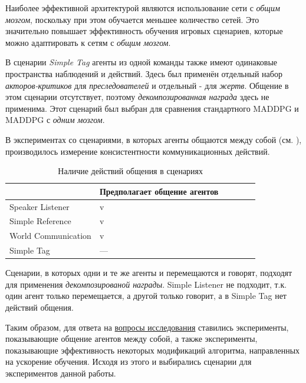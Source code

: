 Наиболее эффективной архитектурой являются использование сети с \textit{общим мозгом}, поскольку при этом обучается меньшее количество сетей. Это значительно повышает эффективность обучения игровых сценариев, которые можно адаптировать к сетям с \textit{общим мозгом}.

В сценарии \textit{Simple Tag} агенты из одной команды также имеют одинаковые пространства наблюдений и действий. Здесь был применён отдельный набор \textit{акторов-критиков} для \textit{преследователей} и отдельный - для \textit{жертв}. Общение в этом сценарии отсутствует, поэтому \textit{декомпозированная награда} здесь не применима. Этот сценарий был выбран для сравнения стандартного MADDPG и MADDPG с \textit{одним мозгом}.

В экспериментах со сценариями, в которых агенты общаются между собой (см. ), производилось измерение консистентности коммуникационных действий.

\begin{table}[t!]
    \centering\small
    \caption{Наличие действий общения в сценариях}
    \label{tab-communicational-scenarious}
    \begin{tabular}{|l|l|l|l|l|l|}
        \hline
        & Предполагает общение агентов \\
        \hline
        Speaker Listener    & v                            \\
        \hline
        Simple Reference    & v                            \\
        \hline
        World Communication & v                            \\
        \hline
        Simple Tag          & ---                          \\
        \hline
    \end{tabular}
    \normalsize%
\end{table}

Сценарии, в которых одни и те же агенты и перемещаются и говорят, подходят для применения \textit{декомпозированой награды}. Simple Listener не подходит, т.к. один агент только перемещается, а другой только говорит, а в Simple Tag нет действий общения.

Таким образом, для ответа на \hyperref[intro-questions]{вопросы исследования} ставились эксперименты, показывающие общение агентов между собой, а также эксперименты, показывающие эффективность некоторых модификаций алгоритма, направленных на ускорение обучения. Исходя из этого и выбирались сценарии для экспериментов данной работы.
